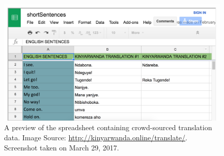 \begin{figure}[h]
\begin{center}
\captionsetup{justification=centering}
\includegraphics[width=6in]{figures/kinyarwanda-online-spreadsheet.png}
\caption{A preview of the spreadsheet containing crowd-sourced translation data. 
Image Source: \protect\url{http://kinyarwanda.online/translate/}. Screenshot taken on March 29, 2017.}
\end{center}
\end{figure}